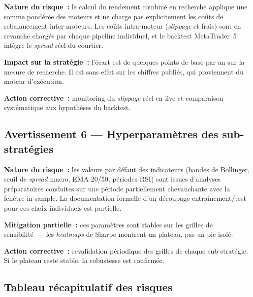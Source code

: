 \begin{warningbox}
\textbf{Nature du risque~:} le calcul du rendement combiné en recherche applique une somme pondérée des moteurs et ne charge pas explicitement les coûts de rebalancement inter-moteurs. Les coûts intra-moteur (\emph{slippage} et frais) sont en revanche chargés par chaque pipeline individuel, et le backtest MetaTrader~5 intègre le \emph{spread} réel du courtier.

\textbf{Impact sur la stratégie~:} l'écart est de quelques points de base par an sur la mesure de recherche. Il est sans effet sur les chiffres publiés, qui proviennent du moteur d'exécution.

\textbf{Action corrective~:} monitoring du \emph{slippage} réel en live et comparaison systématique aux hypothèses du backtest.
\end{warningbox}

\subsection{Avertissement 6 --- Hyperparamètres des sub-stratégies}

\begin{warningbox}
\textbf{Nature du risque~:} les valeurs par défaut des indicateurs (bandes de Bollinger, seuil de \emph{spread} macro, EMA 20/50, périodes RSI) sont issues d'analyses préparatoires conduites sur une période partiellement chevauchante avec la fenêtre in-sample. La documentation formelle d'un découpage entraînement/test pour ces choix individuels est partielle.

\textbf{Mitigation partielle~:} ces paramètres sont stables sur les grilles de sensibilité~--- les \emph{heatmaps} de Sharpe montrent un plateau, pas un pic isolé.

\textbf{Action corrective~:} revalidation périodique des grilles de chaque sub-stratégie. Si le plateau reste stable, la robustesse est confirmée.
\end{warningbox}

\subsection{Tableau récapitulatif des risques}


